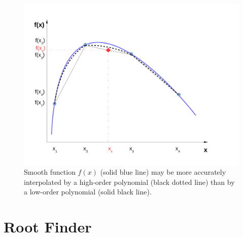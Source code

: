      \begin{figure}\label{Appendix:Fig:Interpolation}%
        \begin{center}
          \includegraphics[width=\columnwidth,clip]{./Pics/Interpolation}
           \caption{Smooth function $f(x)$ (solid blue line) may be more accurately interpolated by a high-order polynomial (black dotted line) than by a low-order polynomial (solid black line).} 
        \end{center}
      \end{figure}


\section{Root Finder}
